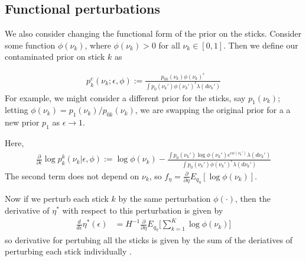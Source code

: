 \subsection{Functional perturbations}
\label{sec:func_pert}
%
We also consider changing the functional form of the prior on the sticks.
Consider some function $\phi(\nu_k)$, where $\phi(\nu_k) > 0$ for all $\nu_k \in
[0, 1]$. Then we define our contaminated prior on stick $k$ as

\begin{align}
	\label{eq:expon_perturb}
	p^c_{k}(\nu_k ; \epsilon, \phi) :=
  \frac{p_{0k}(\nu_k)\phi(\nu_k)^\epsilon}{\int p_0(\nu_k')\phi(\nu_k')^\epsilon \lambda(d\nu_k')}
\end{align}
%
For example, we might consider a different prior for the sticks, say
$p_1(\nu_k)$; letting $\phi(\nu_k) = p_1(\nu_k) / p_{0k}(\nu_k)$, we are
swapping the original prior for a a new prior $p_1$ as $\epsilon \rightarrow 1$.

Here,
%
\begin{align}
  \frac{\partial}{\partial \epsilon} \log p_k^k(\nu_k | \epsilon, \phi) := \log \phi(\nu_k) -
    \frac{\int p_0(\nu_k')\log\phi(\nu_k')e^{\epsilon\phi(\nu_k')} \lambda(d\nu_k')}{\int p_0(\nu_k')\phi(\nu_k')^\epsilon \lambda(d\nu_k')}
\end{align}
%
The second term does not depend on $\nu_k$, so $f_\eta =
\frac{\partial}{\partial \eta} E_{q_\eta}[\log \phi(\nu_k)]$.

Now if we perturb each stick $k$ by the same perturbation $\phi(\cdot)$, then
the derivative of $\eta^*$ with respect to this perturbation is given by
%
\begin{align}
   \frac{d}{d\epsilon}\eta^*(\epsilon) &=
   H^{-1}\frac{\partial}{\partial \eta} E_{q_\eta}\Big[\sum_{k = 1}^K \log \phi(\nu_k)\Big]
  \label{eq:sensitivity_exp_pert}
\end{align}
%
so derivative for pertubing all the sticks is given by the sum of the deriatives
of perturbing each stick individually
\citep{gustafson:2012:localrobustnessbook}.

